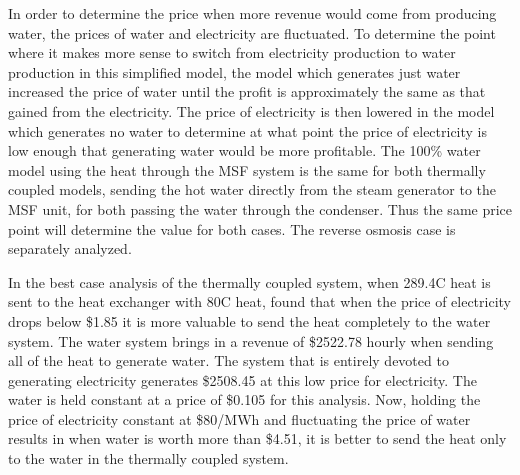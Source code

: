 

In order to determine the price when more revenue would come from producing water, the prices of water and electricity are fluctuated.  To determine the point where it makes more sense to switch from electricity production to water production in this simplified model, the model which generates just water increased the price of water until the profit is approximately the same as that gained from the electricity.  The price of electricity is then lowered in the model which generates no water to determine at what point the price of electricity is low enough that generating water would be more profitable.  The 100\% water model using the heat through the MSF system is the same for both thermally coupled models, sending the hot water directly from the steam generator to the MSF unit, for both passing the water through the condenser. Thus the same price point will determine the value for both cases. The reverse osmosis case is separately analyzed.

In the best case analysis of the thermally coupled system, when 289.4\degree C heat is sent to the heat exchanger with 80\degree C heat, found that when the price of electricity drops below \$1.85 it is more valuable to send the heat completely to the water system. The water system brings in a revenue of \$2522.78 hourly when sending all of the heat to generate water.  The system that is entirely devoted to generating electricity generates \$2508.45 at this low price for electricity. The water is held constant at a price of \$0.105 for this analysis.  Now, holding the price of electricity constant at \$80/MWh and fluctuating the price of water results in when water is worth more than \$4.51, it is better to send the heat only to the water in the thermally coupled system.

